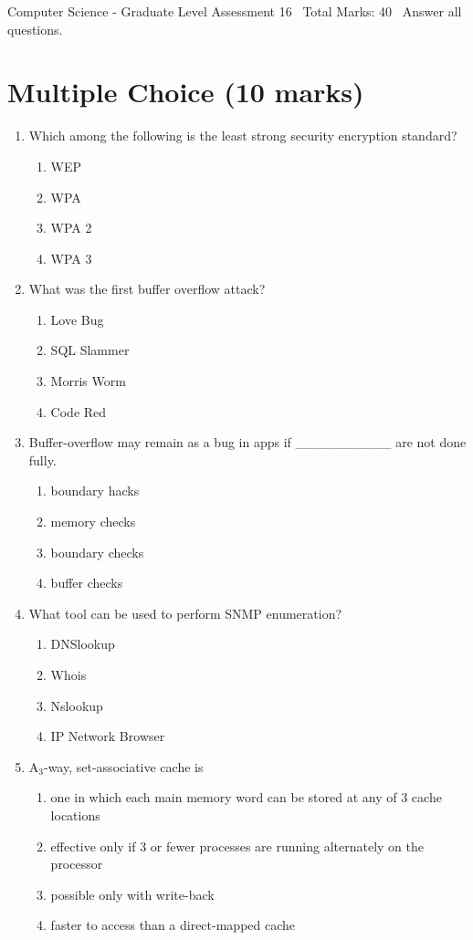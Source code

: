 \documentclass[12pt]{article}
\begin{document}
\begin{center}
Computer Science - Graduate Level Assessment 16 \
Total Marks: 40 \
Answer all questions.
\end{center}

\section*{Multiple Choice (10 marks)}
\begin{enumerate}[label=\arabic*.]
\item Which among the following is the least strong security encryption standard?
\begin{enumerate}[label=(\alph*)]
    \item WEP
    \item WPA
    \item WPA 2
    \item WPA 3
\end{enumerate}
\item What was the first buffer overflow attack?
\begin{enumerate}[label=(\alph*)]
    \item Love Bug
    \item SQL Slammer
    \item Morris Worm
    \item Code Red
\end{enumerate}
\item Buffer-overflow may remain as a bug in apps if \_\_\_\_\_\_\_\_\_\_ are not done fully.
\begin{enumerate}[label=(\alph*)]
    \item boundary hacks
    \item memory checks
    \item boundary checks
    \item buffer checks
\end{enumerate}
\item What tool can be used to perform SNMP enumeration?
\begin{enumerate}[label=(\alph*)]
    \item DNSlookup
    \item Whois
    \item Nslookup
    \item IP Network Browser
\end{enumerate}
\item A$_{3}$-way, set-associative cache is
\begin{enumerate}[label=(\alph*)]
    \item one in which each main memory word can be stored at any of 3 cache locations
    \item effective only if 3 or fewer processes are running alternately on the processor
    \item possible only with write-back
    \item faster to access than a direct-mapped cache
\end{enumerate}
\end{enumerate}
\end{document}
